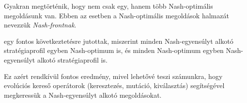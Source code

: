 \begin{ert}
  Gyakran megtörténik, hogy nem csak egy, hanem több Nash-optimális megoldásunk van.
  Ebben az esetben a Nash-optimális megoldások halmazát nevezzük \emph{Nash-frontnak}.
\end{ert}


\begin{tet}\label{thm:NE_EGYENLO_NF}
   egy fontos következtetésre jutottak, miszerint minden Nash-egyensúlyt alkotó stratégiaprofil egyben Nash-optimum is, és minden Nash-optimum egyben Nash-egyensúlyt alkotó stratégiaprofil is.
\end{tet}

Ez azért rendkívül fontos eredmény, mivel lehetővé teszi számunkra, hogy evolúciós kereső operátorok (keresztezés, mutáció, kiválasztás) segítségével megkeressük a Nash-egyensúlyt alkotó megoldásokat.


